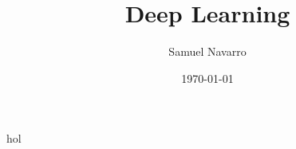 \documentclass[11pt, a4paper]{article}
\begin{document}
\title{Deep Learning}
\author{Samuel Navarro}
\date{\today}
\maketitle

\tableofcontents


hol

	
\end{document}
